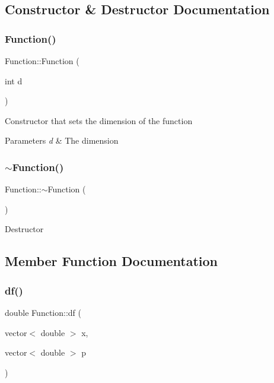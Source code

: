 \subsection{Constructor \& Destructor Documentation}
\mbox{\label{class_function_ac4ef8a9550f628915abdede307d652c0}} 
\subsubsection{\texorpdfstring{Function()}{Function()}}
{\footnotesize\ttfamily Function\+::\+Function (\begin{DoxyParamCaption}\item[{int}]{d }\end{DoxyParamCaption})}

Constructor that sets the dimension of the function 
\begin{DoxyParams}{Parameters}
{\em d} & The dimension \\
\hline
\end{DoxyParams}
\mbox{\label{class_function_a3b03f7cf0b75d16edebdda1dee1db6fd}} 
\subsubsection{\texorpdfstring{$\sim$\+Function()}{~Function()}}
{\footnotesize\ttfamily Function\+::$\sim$\+Function (\begin{DoxyParamCaption}{ }\end{DoxyParamCaption})\hspace{0.3cm}{\ttfamily [virtual]}}

Destructor 

\subsection{Member Function Documentation}
\mbox{\label{class_function_a79b1acaf1d2734de05bf19cd4f702ea5}} 
\subsubsection{\texorpdfstring{df()}{df()}}
{\footnotesize\ttfamily double Function\+::df (\begin{DoxyParamCaption}\item[{vector$<$ double $>$}]{x,  }\item[{vector$<$ double $>$}]{p }\end{DoxyParamCaption})}

